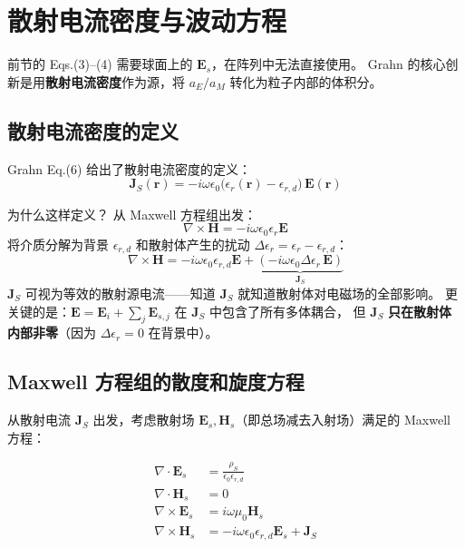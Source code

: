 \section{散射电流密度与波动方程}

前节的 Eqs.(3)--(4) 需要球面上的 $\mathbf{E}_s$，在阵列中无法直接使用。
Grahn 的核心创新是用\textbf{散射电流密度}作为源，将 $a_E/a_M$ 转化为粒子内部的体积分。

\subsection{散射电流密度的定义}

Grahn Eq.(6) 给出了散射电流密度的定义：
\begin{equation}
  \boxed{\;
    \mathbf{J}_S(\mathbf{r}) = -i\omega\epsilon_0\bigl(\epsilon_r(\mathbf{r}) - \epsilon_{r,d}\bigr)\,\mathbf{E}(\mathbf{r})
    \;}
  \label{eq:Js}
\end{equation}

\begin{stepbox}{为什么这样定义？}
从 Maxwell 方程组出发：
$$
\nabla\times\mathbf{H} = -i\omega\epsilon_0\epsilon_r\mathbf{E}
$$
将介质分解为背景 $\epsilon_{r,d}$ 和散射体产生的扰动 $\Delta\epsilon_r = \epsilon_r - \epsilon_{r,d}$：
$$
\nabla\times\mathbf{H} = -i\omega\epsilon_0\epsilon_{r,d}\mathbf{E} + \underbrace{(-i\omega\epsilon_0\Delta\epsilon_r\,\mathbf{E})}_{\mathbf{J}_S}
$$
$\mathbf{J}_S$ 可视为等效的散射源电流——知道 $\mathbf{J}_S$ 就知道散射体对电磁场的全部影响。
更关键的是：$\mathbf{E} = \mathbf{E}_i + \sum_j\mathbf{E}_{s,j}$ 在 $\mathbf{J}_S$ 中包含了所有多体耦合，
但 $\mathbf{J}_S$ \textbf{只在散射体内部非零}（因为 $\Delta\epsilon_r=0$ 在背景中）。
\end{stepbox}

\subsection{Maxwell 方程组的散度和旋度方程}

从散射电流 $\mathbf{J}_S$ 出发，考虑散射场 $\mathbf{E}_s,\mathbf{H}_s$（即总场减去入射场）满足的 Maxwell 方程：

\begin{align}
  \nabla\cdot\mathbf{E}_s &= \frac{\rho_S}{\epsilon_0\epsilon_{r,d}} \label{eq:divE}\\
  \nabla\cdot\mathbf{H}_s &= 0 \label{eq:divH}\\
  \nabla\times\mathbf{E}_s &= i\omega\mu_0\mathbf{H}_s \label{eq:curlE}\\
  \nabla\times\mathbf{H}_s &= -i\omega\epsilon_0\epsilon_{r,d}\mathbf{E}_s + \mathbf{J}_S \label{eq:curlH}
\end{align}

